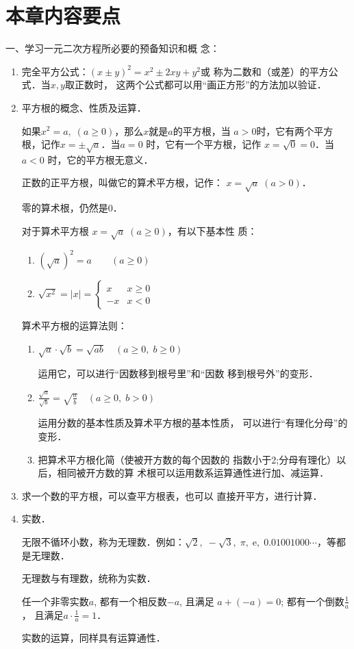 \section*{本章内容要点}
一、学习一元二次方程所必要的预备知识和概
念：
\begin{enumerate}
    \item 完全平方公式：$(x\pm y)^2=x^2\pm 2xy+y^2$或
称为二数和（或差）的平方公式．当$x,y$取正数时，
这两个公式都可以用“画正方形”的方法加以验证．
\item 平方根的概念、性质及运算．

如果$x^2=a,\; (a\ge 0)$，那么$x$就是$a$的平方根，当
$a>0$时，它有两个平方根，记作$x=\pm\sqrt{a}$．当$a=0$
时，它有一个平方根，记作
$x=\sqrt{0}=0$．当$a<0$
时，它的平方根无意义．

正数的正平方根，叫做它的算术平方根，记作：
$x=\sqrt{a}\; (a>0)$．

零的算术根，仍然是0．

对于算术平方根
$x=\sqrt{a}\; (a\ge 0)$，有以下基本性
质：
\begin{enumerate}
    \item $(\sqrt{a})^2=a\qquad (a\ge 0)$
    \item $\sqrt{x^2}=|x|=\begin{cases}
        x& x\ge 0\\
        -x& x<0
    \end{cases}$
\end{enumerate}


算术平方根的运算法则：
\begin{enumerate}
    \item $\sqrt{a}\cdot \sqrt{b}=\sqrt{ab}\quad (a\ge 0,\; b\ge 0)$
    
    运用它，可以进行“因数移到根号里”和“因数
移到根号外”的变形．

\item $\frac{\sqrt{a}}{\sqrt{b}}=\sqrt{\frac{a}{b}}\quad (a\ge 0,\; b> 0)$

运用分数的基本性质及算术平方根的基本性质，
可以进行“有理化分母”的变形．

\item 把算术平方根化简（使被开方数的每个因数的
指数小于2;分母有理化）以后，相同被开方数的算
术根可以运用数系运算通性进行加、减运算．
\end{enumerate}

\item 求一个数的平方根，可以查平方根表，也可以
直接开平方，进行计算．
\item 实数．

无限不循环小数，称为无理数．例如：$\sqrt{2},\; -\sqrt{3},\; \pi,\; $e$,\; 0.01001000\cdots$，等都是无理数．

无理数与有理数，统称为实数．

任一个非零实数$a$, 都有一个相反数$-a$, 且满足
$a+(-a)=0$; 都有一个倒数$\frac{1}{a}$，
且满足$a\cdot \frac{1}{a}=1$．

实数的运算，同样具有运算通性．
\end{enumerate}

